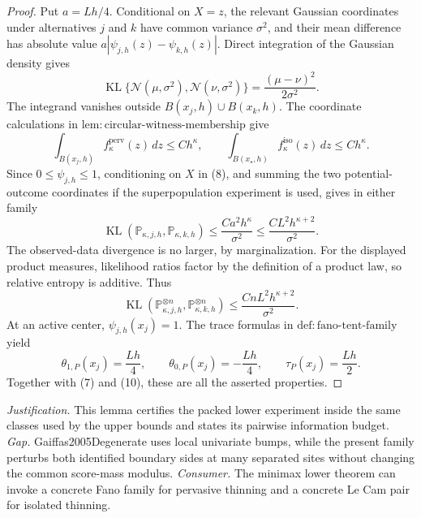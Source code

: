 \documentclass{article}
\begin{document}
\begin{proof}
Put \(a=Lh/4\). Conditional on \(X=z\), the relevant Gaussian coordinates under alternatives \(j\) and \(k\) have common variance \(\sigma^2\), and their mean difference has absolute value \(a|\psi_{j,h}(z)-\psi_{k,h}(z)|\). Direct integration of the Gaussian density gives
\[
 \operatorname{KL}\{\mathcal N(\mu,\sigma^2),\mathcal N(\nu,\sigma^2)\}
 =\frac{(\mu-\nu)^2}{2\sigma^2}. \tag{8}
\]
The integrand vanishes outside \(B(x_j,h)\cup B(x_k,h)\). The coordinate calculations in \(\mathrm{lem:circular\text{-}witness\text{-}membership}\) give
\[
 \int_{B(x_j,h)}f_{\kappa}^{\mathrm{perv}}(z)\,dz\le Ch^{\kappa},
 \qquad
 \int_{B(x_{\star},h)}f_{\kappa}^{\mathrm{iso}}(z)\,dz\le Ch^{\kappa}.
\]
Since \(0\le\psi_{j,h}\le1\), conditioning on \(X\) in (8), and summing the two potential-outcome coordinates if the superpopulation experiment is used, gives in either family
\[
 \operatorname{KL}(\mathbb P_{\kappa,j,h},\mathbb P_{\kappa,k,h})
 \le \frac{Ca^2h^{\kappa}}{\sigma^2}
 \le \frac{CL^2h^{\kappa+2}}{\sigma^2}. \tag{9}
\]
The observed-data divergence is no larger, by marginalization. For the displayed product measures, likelihood ratios factor by the definition of a product law, so relative entropy is additive. Thus
\[
 \operatorname{KL}(\mathbb P_{\kappa,j,h}^{\otimes n},
 \mathbb P_{\kappa,k,h}^{\otimes n})
 \le \frac{CnL^2h^{\kappa+2}}{\sigma^2}. \tag{10}
\]
At an active center, \(\psi_{j,h}(x_j)=1\). The trace formulas in \(\mathrm{def:fano\text{-}tent\text{-}family}\) yield
\[
 \theta_{1,P}(x_j)=\frac{Lh}{4},\qquad
 \theta_{0,P}(x_j)=-\frac{Lh}{4},\qquad
 \tau_P(x_j)=\frac{Lh}{2}.
\]
Together with (7) and (10), these are all the asserted properties.
\end{proof}
\par\smallskip\noindent \textit{Justification.} This lemma certifies the packed lower experiment inside the same classes used by the upper bounds and states its pairwise information budget. \textit{Gap.} Gaiffas2005Degenerate uses local univariate bumps, while the present family perturbs both identified boundary sides at many separated sites without changing the common score-mass modulus. \textit{Consumer.} The minimax lower theorem can invoke a concrete Fano family for pervasive thinning and a concrete Le Cam pair for isolated thinning.
\end{document}
